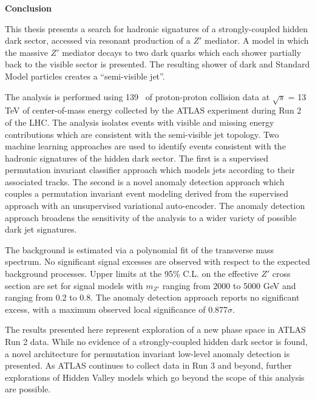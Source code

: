 
\begin{center}
\pagebreak
\vspace*{1\baselineskip}
\textbf{\large Conclusion}
\end{center}


This thesis presents a search for hadronic signatures of a strongly-coupled hidden dark sector, accessed via resonant production of a $Z'$ mediator. A model in which the massive $Z'$ mediator decays to two dark quarks which each shower partially back to the visible sector is presented. The resulting shower of dark and Standard Model particles creates a ``semi-visible jet''.\par

The analysis is performed using 139 \fb~of proton-proton collision data at $\sqrt{s}$ = 13 TeV of center-of-mass energy collected by the ATLAS experiment during Run 2 of the LHC. The analysis isolates events with visible and missing energy contributions which are consistent with the semi-visible jet topology. Two machine learning approaches are used to identify events consistent with the hadronic signatures of the hidden dark sector. The first is a supervised permutation invariant classifier approach which models jets according to their associated tracks. The second is a novel anomaly detection approach which couples a permutation invariant event modeling derived from the supervised approach with an unsupervised variational auto-encoder. The anomaly detection approach broadens the sensitivity of the analysis to a wider variety of possible dark jet signatures.\par

The background is estimated via a polynomial fit of the transverse mass spectrum. No significant signal excesses are observed with respect to the expected background processes. Upper limits at the 95\% C.L. on the effective $Z'$ cross section are set for signal models with $m_{Z'}$ ranging from 2000 to 5000 GeV and \rinv~ ranging from 0.2 to 0.8. The anomaly detection approach reports no significant excess, with a maximum observed local significance of 0.877$\sigma$. \par

The results presented here represent exploration of a new phase space in ATLAS Run 2 data. While no evidence of a strongly-coupled hidden dark sector is found, a novel architecture for permutation invariant low-level anomaly detection is presented. As ATLAS continues to collect data in Run 3 and beyond, further explorations of Hidden Valley models which go beyond the scope of this analysis are possible.




